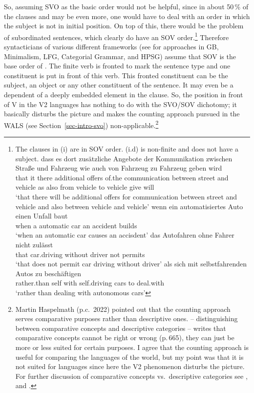 So, assuming
SVO as the basic order would not be helpful, since in about 50\,\% of the clauses and may be even
more, one would have to deal with an order in which the subject is not in initial position. On top of
this, there would be the problem of subordinated sentences, which clearly do have an SOV
order.\footnote{
The clauses in (i) are in SOV order. (i.d) is non-finite and does not have a subject.
\eal
\ex 
\gll dass es dort zusätzliche Angebote der Kommunikation zwischen Straße und Fahrzeug wie auch von Fahrzeug zu Fahrzeug geben wird\\
     that it there additional offers   of.the communication between street and vehicle as also from vehicle to vehicle give will\\
\glt `that there will be additional offers for communication between street and vehicle and also
between vehicle and vehicle'
\ex 
\gll wenn ein automatisiertes Auto einen Unfall baut\\
     when a   automatic       car  an accident  builds\\
\glt `when an automatic car causes an accisdent'
\ex 
\gll das Autofahren ohne Fahrer nicht zulässt\\
     that car.driving without driver not permits\\
\glt `that does not permit car driving without driver'
\ex
\gll als sich mit selbstfahrenden Autos zu beschäftigen\\
     rather.than self with self.driving cars to deal.with\\
\glt `rather than dealing with autonomous cars'
\zllast
}
 Therefore syntacticians of various different frameworks (see \citealp{MuellerGT-Eng} for
approaches in GB, Minimalism, LFG, Categorial Grammar, and HPSG) assume that SOV is the base order of
. The finite verb is fronted to mark the sentence type and one constituent is put in front of
this verb. This fronted constituent can be the subject, an object or any other constituent of the
sentence. It may even be a dependent of a deeply embedded element in the clause. So, the position
in front of V in the V2 languages has nothing to do with the SVO/SOV dichotomy; it basically disturbs
the picture and makes the counting approach pursued in the WALS (see Section~\ref{sec-intro-svo})
non-applicable.\footnote{
  Martin Haspelmath (p.c.\ 2022) pointed out that the counting approach serves comparative
  purposes rather than descriptive ones. \citet{Haspelmath2010a} -- distinguishing between comparative concepts and descriptive
  categories -- writes that comparative concepts cannot be right or wrong (p.\,665), they can just be more or
  less suited for certain purposes. I agree that the counting approach is useful for comparing the
  languages of the world, but my point was that it is not suited for  languages since here
  the V2 phenomenon disturbs the picture. For further discussion of comparative concepts vs.\ descriptive categories
  see ,  and .
}
